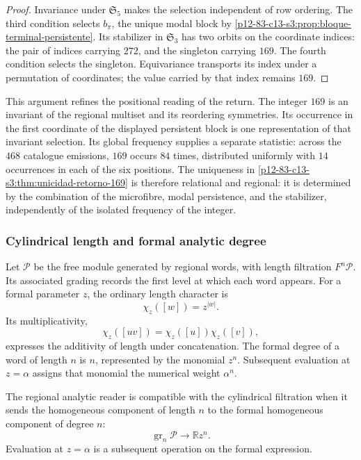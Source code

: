 \begin{proof}
Invariance under \(\mathfrak S_5\) makes the selection independent of row
ordering. The third condition selects \(b_\pi\), the unique modal block
by \cref{p12-83-c13-s3:prop:bloque-terminal-persistente}. Its stabilizer in
\(\mathfrak S_3\) has two orbits on the coordinate indices: the pair of
indices carrying \(272\), and the singleton carrying \(169\). The fourth
condition selects the singleton. Equivariance transports its index under
a permutation of coordinates; the value carried by that index remains
\(169\).
\end{proof}

This argument refines the positional reading of the return. The integer
\(169\) is an invariant of the regional multiset and its reordering
symmetries. Its occurrence in the first coordinate of the displayed
persistent block is one representation of that invariant selection.
Its global frequency supplies a separate statistic: across the \(468\)
catalogue emissions, \(169\) occurs \(84\) times, distributed uniformly
with \(14\) occurrences in each of the six positions. The uniqueness in
\cref{p12-83-c13-s3:thm:unicidad-retorno-169} is therefore relational and
regional: it is determined by the combination of the microfibre, modal
persistence, and the stabilizer, independently of the isolated frequency
of the integer.

\subsubsection{Cylindrical length and formal analytic degree}

Let \(\mathcal P\) be the free module generated by regional words, with
length filtration \(F^n\mathcal P\). Its associated grading records the
first level at which each word appears. For a formal parameter \(z\), the
ordinary length character is
\[
\chi_z([w])=z^{|w|}.
\]
Its multiplicativity,
\[
\chi_z([uv])=\chi_z([u])\chi_z([v]),
\]
expresses the additivity of length under concatenation. The formal degree
of a word of length \(n\) is \(n\), represented by the monomial \(z^n\).
Subsequent evaluation at \(z=\alpha\) assigns that monomial the numerical
weight \(\alpha^n\).

\begin{definition}
\label{p12-83-c13-s3:def:compatibilidad-grado}
The regional analytic reader is compatible with the cylindrical
filtration when it sends the homogeneous component of length \(n\) to
the formal homogeneous component of degree \(n\):
\[
\operatorname{gr}_n\mathcal P\longrightarrow
\mathbb R z^n.
\]
Evaluation at \(z=\alpha\) is a subsequent operation on the formal
expression.
\end{definition}

